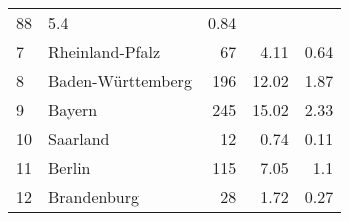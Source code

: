 \begin{longtable}{lXrrr}
       \num{88} &
       \num[round-mode=places,round-precision=2]{5.4} &
         \num[round-mode=places,round-precision=2]{0.84} \\

     7 &
     \multicolumn{1}{X}{ Rheinland-Pfalz   } &


       \num{67} &
       \num[round-mode=places,round-precision=2]{4.11} &
         \num[round-mode=places,round-precision=2]{0.64} \\

     8 &
     \multicolumn{1}{X}{ Baden-Württemberg   } &


       \num{196} &
       \num[round-mode=places,round-precision=2]{12.02} &
         \num[round-mode=places,round-precision=2]{1.87} \\

     9 &
     \multicolumn{1}{X}{ Bayern   } &


       \num{245} &
       \num[round-mode=places,round-precision=2]{15.02} &
         \num[round-mode=places,round-precision=2]{2.33} \\

     10 &
     \multicolumn{1}{X}{ Saarland   } &


       \num{12} &
       \num[round-mode=places,round-precision=2]{0.74} &
         \num[round-mode=places,round-precision=2]{0.11} \\

     11 &
     \multicolumn{1}{X}{ Berlin   } &


       \num{115} &
       \num[round-mode=places,round-precision=2]{7.05} &
         \num[round-mode=places,round-precision=2]{1.1} \\

     12 &
     \multicolumn{1}{X}{ Brandenburg   } &


       \num{28} &
       \num[round-mode=places,round-precision=2]{1.72} &
         \num[round-mode=places,round-precision=2]{0.27} \\


\end{longtable}
